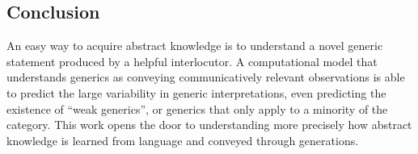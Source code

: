 \documentclass[floatsintext,doc]{apa6}
\begin{document}
\hypertarget{conclusion}{%
\subsection{Conclusion}\label{conclusion}}

An easy way to acquire abstract knowledge is to understand a novel generic statement produced by a helpful interlocutor. 
A computational model that understands generics as conveying communicatively relevant observations is able to predict the large variability in generic interpretations, even predicting the existence of \enquote{weak generics}, or generics that only apply to a minority of the category.
This work opens the door to understanding more precisely how abstract knowledge is learned from language and conveyed through generations.

\newpage



\end{document}
